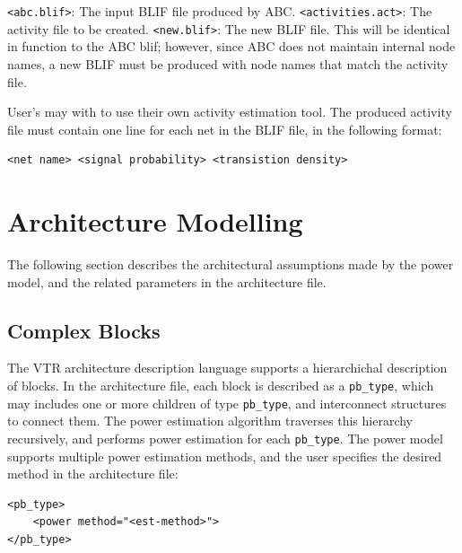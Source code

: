 \documentclass[letterpaper,twoside,10pt]{article}
\begin{document}
\texttt{<abc.blif>}: The input BLIF file produced by ABC. \newline
\texttt{<activities.act>}: The activity file to be created. \newline
\texttt{<new.blif>}: The new BLIF file.  This will be identical in function to the ABC blif; however, since ABC does not maintain internal node names, a new BLIF must be produced with node names that match the activity file. \newline
	
User's may with to use their own activity estimation tool.  The produced activity file must contain one line for each net in the BLIF file, in the following format: 

\begin{BVerbatim}[bgcolor=LightGray, boxwidth=\textwidth] 
<net name> <signal probability> <transistion density>
\end{BVerbatim}
	

\newpage
\section{Architecture Modelling} \label{sec:arch_modelling}
The following section describes the architectural assumptions made by the power model, and the related parameters in the architecture file.

\subsection{Complex Blocks} \label{sec:clbs}
The VTR architecture description language supports a hierarchichal description of blocks.  In the architecture file, each block is described as a \texttt{pb\_type}, which may includes one or more children of type \texttt{pb\_type}, and interconnect structures to connect them.  The power estimation algorithm traverses this hierarchy recursively, and performs power estimation for each \texttt{pb\_type}.  The power model supports multiple power estimation methods, and the user specifies the desired method in the architecture file: \newline
\begin{BVerbatim}[bgcolor=LightGray, boxwidth=\textwidth] 
<pb_type>
	<power method="<est-method>">
</pb_type>
\end{BVerbatim}
\end{document}
